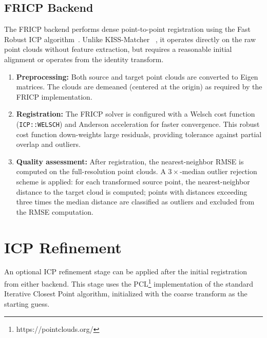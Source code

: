 \subsection{FRICP Backend}
\label{sec:fricp}

The FRICP backend performs dense point-to-point registration using the
Fast Robust ICP algorithm~\cite{zhang_fast}.
Unlike KISS-Matcher ~\cite{KISSMATCHER}, it operates directly on the raw point clouds without
feature extraction, but requires a reasonable initial alignment or operates
from the identity transform.

\begin{enumerate}
    \item \textbf{Preprocessing:}
          Both source and target point clouds are converted to Eigen matrices.
          The clouds are demeaned (centered at the origin) as required by the
          FRICP implementation.

    \item \textbf{Registration:}
          The FRICP solver is configured with a Welsch cost function
          (\texttt{ICP::WELSCH}) and Anderson acceleration for faster convergence.
          This robust cost function down-weights large residuals, providing
          tolerance against partial overlap and outliers.

    \item \textbf{Quality assessment:}
          After registration, the nearest-neighbor RMSE is computed on the
          full-resolution point clouds.
          A $3\times$-median outlier rejection scheme is applied:
          for each transformed source point, the nearest-neighbor distance to
          the target cloud is computed; points with distances exceeding three
          times the median distance are classified as outliers and excluded
          from the RMSE computation.
\end{enumerate}

\section{ICP Refinement}
\label{sec:icp_refinement}

An optional ICP refinement stage can be applied after the initial registration
from either backend.
This stage uses the PCL\footnote{https://pointclouds.org/} implementation of the standard Iterative Closest Point
algorithm, initialized with the coarse transform as the starting guess.


